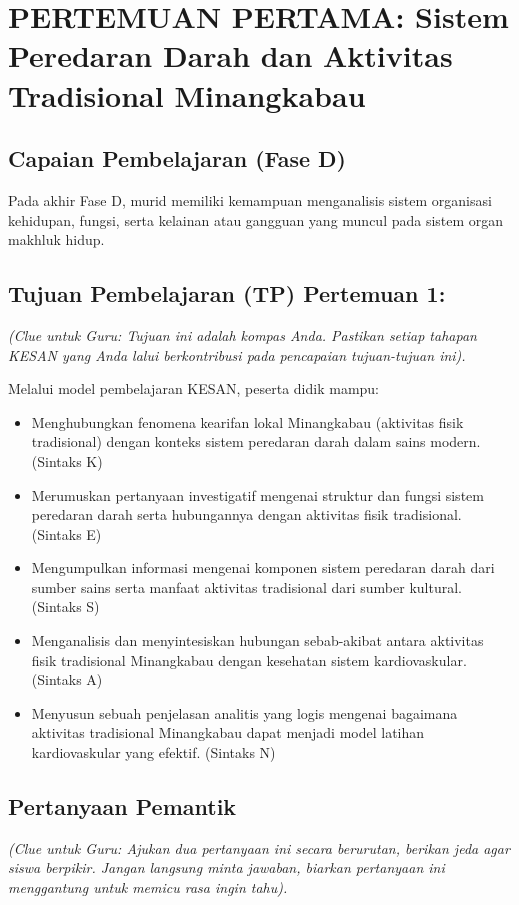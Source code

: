 \documentclass[a4paper,12pt]{article}
\begin{document}
\section{PERTEMUAN PERTAMA: Sistem Peredaran Darah dan Aktivitas Tradisional Minangkabau}

\subsection{Capaian Pembelajaran (Fase D)}
Pada akhir Fase D, murid memiliki kemampuan menganalisis sistem organisasi kehidupan, fungsi, serta kelainan atau gangguan yang muncul pada sistem organ makhluk hidup.

\subsection{Tujuan Pembelajaran (TP) Pertemuan 1:}
\textit{(Clue untuk Guru: Tujuan ini adalah kompas Anda. Pastikan setiap tahapan KESAN yang Anda lalui berkontribusi pada pencapaian tujuan-tujuan ini).}

Melalui model pembelajaran KESAN, peserta didik mampu:
\begin{itemize}
\item Menghubungkan fenomena kearifan lokal Minangkabau (aktivitas fisik tradisional) dengan konteks sistem peredaran darah dalam sains modern. (Sintaks K)
\item Merumuskan pertanyaan investigatif mengenai struktur dan fungsi sistem peredaran darah serta hubungannya dengan aktivitas fisik tradisional. (Sintaks E)
\item Mengumpulkan informasi mengenai komponen sistem peredaran darah dari sumber sains serta manfaat aktivitas tradisional dari sumber kultural. (Sintaks S)
\item Menganalisis dan menyintesiskan hubungan sebab-akibat antara aktivitas fisik tradisional Minangkabau dengan kesehatan sistem kardiovaskular. (Sintaks A)
\item Menyusun sebuah penjelasan analitis yang logis mengenai bagaimana aktivitas tradisional Minangkabau dapat menjadi model latihan kardiovaskular yang efektif. (Sintaks N)
\end{itemize}

\subsection{Pertanyaan Pemantik}
\textit{(Clue untuk Guru: Ajukan dua pertanyaan ini secara berurutan, berikan jeda agar siswa berpikir. Jangan langsung minta jawaban, biarkan pertanyaan ini menggantung untuk memicu rasa ingin tahu).}
\end{document}
